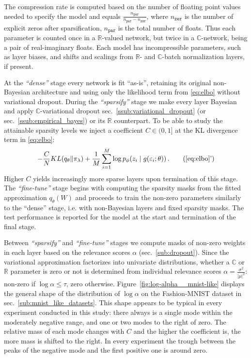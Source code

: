 \documentclass[a4paper,10pt]{article}
\newcommand{\real}{\mathbb{R}}
\newcommand{\cplx}{\mathbb{C}}
\begin{document}
The compression rate is computed based on the number of floating point values needed
to specify the model and equals $
  \frac{n_\mathtt{par}}{n_\mathtt{par} - n_\mathtt{zer}}
$, where $n_\mathtt{zer}$ is the number of explicit zeros after sparsification, $n_\mathtt{par}$
is the total number of floats. Thus each parameter is counted once in a $\real$-valued
network, but twice in a $\cplx$-network, being a pair of real-imaginary floats. Each model
has incompressible parameters, such as layer biases, and shifts and scalings from $\real$-
and $\cplx$-batch normalization layers, if present.

At the \textit{``dense''} stage every network is fit ``as-is'', retaining its original
non-Bayesian architecture and using only the likelihood term from \eqref{eq:elbo} without
variational dropout.
%
During the \textit{``sparsify''} stage we make every layer Bayesian and apply $\cplx$-variational
dropout sec.~\ref{ssub:variational_dropout} (or sec.~\ref{ssub:empirical_bayes}) or its $\real$
counterpart. To be able to study the attainable sparsity levels we inject a coefficient $
  C \in (0, 1]
$ at the KL divergence term in \eqref{eq:elbo}:
\begin{equation}  \label{eq:elbo_with_coef}
    - \frac{C}N KL(q_{\theta} \| \pi_{\lambda})
    + \frac1{M} \sum_{i=1}^M
        \log p_{\phi}(z_i \mid g(\varepsilon_i; \theta))
    \,. \tag{\ref{eq:elbo}'}
\end{equation}
Higher $C$ yields increasingly more sparse layers upon termination of this stage.
%
The \textit{``fine-tune''} stage begins with computing the sparsity masks from the fitted
approximation $q_\theta(W)$ and proceeds to train the non-zero parameters similarly to
the ``dense'' stage, i.e. with non-Bayesian layers and fixed sparsity masks. The test
performance is reported for the model at the start and termination of the final stage.

Between \textit{``sparsify''} and \textit{``fine-tune''} stages we compute masks of non-zero
weights in each layer based on the relevance scores $\alpha$ (sec.~\ref{sub:dropout}). Since
the variational approximation factorizes into univariate distributions, whether a $\cplx$
or $\real$ parameter is zero or not is determined from individual relevance scores $
  \alpha = \tfrac{\sigma^2}{\lvert\mu\rvert^2}
$: non-zero if $\log \alpha \leq \tau$, zero otherwise. Figure~\ref{fig:log-alpha__mnist-like}
displays the general shape of the distribution of $\log \alpha$ on the Fashion-MNIST dataset
in sec.~\ref{sub:mnist_like_datasets}. This shape appears to be typical in every experiment
conducted in this study: there always is a single mode within the moderately negative
range, and one or two modes to the right of zero. The relative mass of each mode changes
with $C$ and the higher the coefficient is, the more mass is shifted to the right. In every
experiment the trough between the peaks of the negative mode and the first positive one
is around zero.
\end{document}
